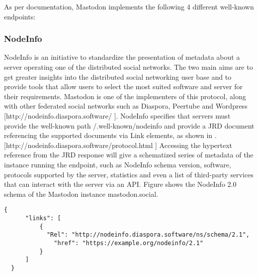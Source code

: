 \cite{nottingham_2019}
As per documentation, Mastodon implements the following 4 different well-known endpoints: 


\subsubsection{NodeInfo}
NodeInfo is an initiative to standardize the presentation of metadata about a server operating one of the distributed social networks. The two main aims are to get greater insights into the distributed social networking user base and to provide tools that allow users to select the most suited software and server for their requirements. Mastodon is one of the implementers of this protocol, along with other federated social networks such as Diaspora, Peertube and Wordpress [http://nodeinfo.diaspora.software/ ]. NodeInfo specifies that servers must provide the well-known path /.well-known/nodeinfo and provide a JRD document referencing the supported documents via Link elements, as shown in \label{NodeInfo response example}. [http://nodeinfo.diaspora.software/protocol.html ] Accessing the hypertext reference from the JRD response will give a schematized series of metadata of the instance running the endpoint, such as NodeInfo schema version, software, protocols supported by the server, statistics and even a list of third-party services that can interact with the server via an API. Figure \label{NodeInfo response for mastodon.social} shows the NodeInfo 2.0 schema of the Mastodon instance mastodon.social. 

\lstset{style=JSONStyle}
\begin{lstlisting}[caption=NodeInfo response example, label=NodeInfo response example, float=H]
  {
      "links": [
          {
            "Rel": "http://nodeinfo.diaspora.software/ns/schema/2.1",
              "href": "https://example.org/nodeinfo/2.1"
          }
      ]
  }
\end{lstlisting}

